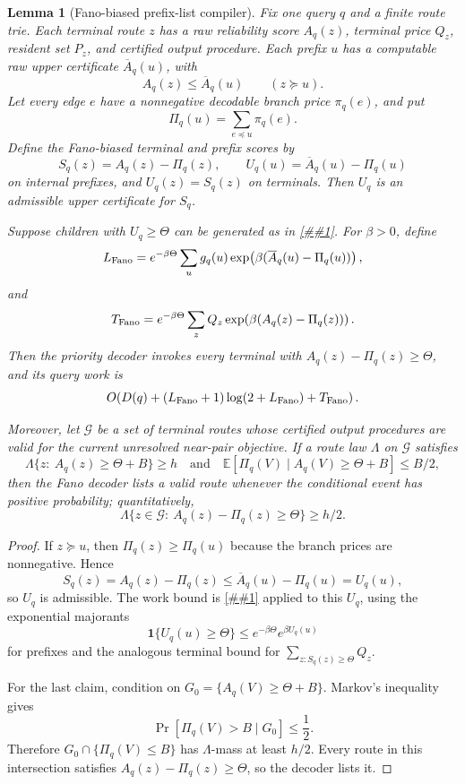 \documentclass[10pt]{article}
\newcommand{\cref}[1]{\ref{##1}}
\newtheorem{lemma}[theorem]{Lemma}
\theoremstyle{definition}
\newcommand{\E}{\mathbb{E}}
\begin{document}
\begin{lemma}[Fano-biased prefix-list compiler]
   \label{lem:fano-biased-prefix-list}
   Fix one query \(q\) and a finite route trie.  Each terminal route \(z\) has
   a raw reliability score \(A_q(z)\), terminal price \(Q_z\), resident set
   \(P_z\), and certified output procedure.  Each prefix \(u\) has a computable
   raw upper certificate \(\overline A_q(u)\), with
   \[
      A_q(z)\le \overline A_q(u)
      \qquad(z\succeq u).
   \]
   Let every edge \(e\) have a nonnegative decodable branch price
   \(\pi_q(e)\), and put
   \[
      \Pi_q(u)=\sum_{e\preceq u}\pi_q(e).
   \]
   Define the Fano-biased terminal and prefix scores by
   \[
      S_q(z)=A_q(z)-\Pi_q(z),
      \qquad
      U_q(u)=\overline A_q(u)-\Pi_q(u)
   \]
   on internal prefixes, and \(U_q(z)=S_q(z)\) on terminals.  Then \(U_q\) is
   an admissible upper certificate for \(S_q\).

   Suppose children with \(U_q\ge\Theta\) can be generated as in
   \cref{lem:priority-prefix-list-decoder}.  For \(\beta>0\), define
   \[
      L_{\rm Fano}
      =
      e^{-\beta\Theta}
      \sum_u g_q(u)
      \exp\!\left(\beta(\overline A_q(u)-\Pi_q(u))\right),
   \]
   and
   \[
      T_{\rm Fano}
      =
      e^{-\beta\Theta}
      \sum_z Q_z
      \exp\!\left(\beta(A_q(z)-\Pi_q(z))\right).
   \]
   Then the priority decoder invokes every terminal with
   \(A_q(z)-\Pi_q(z)\ge\Theta\), and its query work is
   \[
      O\!\left(
         D(q)
         +(L_{\rm Fano}+1)\log(2+L_{\rm Fano})
         +T_{\rm Fano}
      \right).
   \]

   Moreover, let \(\mathcal G\) be a set of terminal routes whose certified
   output procedures are valid for the current unresolved near-pair objective.
   If a route law \(\Lambda\) on \(\mathcal G\) satisfies
   \[
      \Lambda\{z:\ A_q(z)\ge\Theta+B\}\ge h
      \quad\text{and}\quad
      \E[\Pi_q(V)\mid A_q(V)\ge\Theta+B]\le B/2,
   \]
   then the Fano decoder lists a valid route whenever the conditional event has
   positive probability; quantitatively,
   \[
      \Lambda\{z\in\mathcal G:\ A_q(z)-\Pi_q(z)\ge\Theta\}
      \ge h/2 .
   \]
\end{lemma}

\begin{proof}
   If \(z\succeq u\), then \(\Pi_q(z)\ge\Pi_q(u)\) because the branch prices
   are nonnegative.  Hence
   \[
      S_q(z)
      =
      A_q(z)-\Pi_q(z)
      \le
      \overline A_q(u)-\Pi_q(u)
      =
      U_q(u),
   \]
   so \(U_q\) is admissible.  The work bound is
   \cref{cor:prefix-list-resources} applied to this \(U_q\), using the
   exponential majorants
   \[
      \mathbf 1\{U_q(u)\ge\Theta\}
      \le e^{-\beta\Theta}e^{\beta U_q(u)}
   \]
   for prefixes and the analogous terminal bound for
   \(\sum_{z:S_q(z)\ge\Theta}Q_z\).

   For the last claim, condition on
   \(G_0=\{A_q(V)\ge\Theta+B\}\).  Markov's inequality gives
   \[
      \Pr[\Pi_q(V)>B\mid G_0]\le\frac12.
   \]
   Therefore \(G_0\cap\{\Pi_q(V)\le B\}\) has \(\Lambda\)-mass at least
   \(h/2\).  Every route in this intersection satisfies
   \(A_q(z)-\Pi_q(z)\ge\Theta\), so the decoder lists it.
\end{proof}
\end{document}
